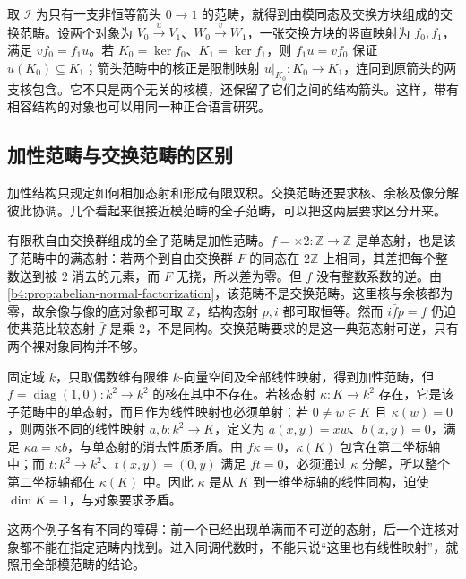 取 \(\mathcal I\) 为只有一支非恒等箭头 \(0\to1\) 的范畴，就得到由模同态及交换方块组成的交换范畴。设两个对象为 \(V_0\xrightarrow uV_1\)、\(W_0\xrightarrow vW_1\)，一张交换方块的竖直映射为 \(f_0,f_1\)，满足 \(vf_0=f_1u\)。若 \(K_0=\ker f_0\)、\(K_1=\ker f_1\)，则 \(f_1u=vf_0\) 保证 \(u(K_0)\subseteq K_1\)；箭头范畴中的核正是限制映射 \(u|_{K_0}:K_0\to K_1\)，连同到原箭头的两支核包含。它不只是两个无关的核模，还保留了它们之间的结构箭头。这样，带有相容结构的对象也可以用同一种正合语言研究。

\subsection{加性范畴与交换范畴的区别}
\label{b4:subsec:0402:03}

加性结构只规定如何相加态射和形成有限双积。交换范畴还要求核、余核及像分解彼此协调。几个看起来很接近模范畴的全子范畴，可以把这两层要求区分开来。

\begin{example}\label{b4:exm:free-category-not-abelian}
	有限秩自由交换群组成的全子范畴是加性范畴。\(f=\times2:\mathbb Z\to\mathbb Z\) 是单态射，也是该子范畴中的满态射：若两个到自由交换群 \(F\) 的同态在 \(2\mathbb Z\) 上相同，其差把每个整数送到被 \(2\) 消去的元素，而 \(F\) 无挠，所以差为零。但 \(f\) 没有整数系数的逆。由\cref{b4:prop:abelian-normal-factorization}，该范畴不是交换范畴。这里核与余核都为零，故余像与像的底对象都可取 \(\mathbb Z\)，结构态射 \(p,i\) 都可取恒等。然而 \(i\bar f p=f\) 仍迫使典范比较态射 \(\bar f\) 是乘 \(2\)，不是同构。交换范畴要求的是这一典范态射可逆，只有两个裸对象同构并不够。
\end{example}

\begin{example}\label{b4:exm:finite-even-dimension}
	固定域 \(k\)，只取偶数维有限维 \(k\)-向量空间及全部线性映射，得到加性范畴，但 \(f=\operatorname{diag}(1,0):k^2\to k^2\) 的核在其中不存在。若核态射 \(\kappa:K\to k^2\) 存在，它是该子范畴中的单态射，而且作为线性映射也必须单射：若 \(0\ne w\in K\) 且 \(\kappa(w)=0\)，则两张不同的线性映射 \(a,b:k^2\to K\)，定义为 \(a(x,y)=xw\)、\(b(x,y)=0\)，满足 \(\kappa a=\kappa b\)，与单态射的消去性质矛盾。由 \(f\kappa=0\)，\(\kappa(K)\) 包含在第二坐标轴中；而 \(t:k^2\to k^2\)、\(t(x,y)=(0,y)\) 满足 \(ft=0\)，必须通过 \(\kappa\) 分解，所以整个第二坐标轴都在 \(\kappa(K)\) 中。因此 \(\kappa\) 是从 \(K\) 到一维坐标轴的线性同构，迫使 \(\dim K=1\)，与对象要求矛盾。
\end{example}

这两个例子各有不同的障碍：前一个已经出现单满而不可逆的态射，后一个连核对象都不能在指定范畴内找到。进入同调代数时，不能只说“这里也有线性映射”，就照用全部模范畴的结论。

